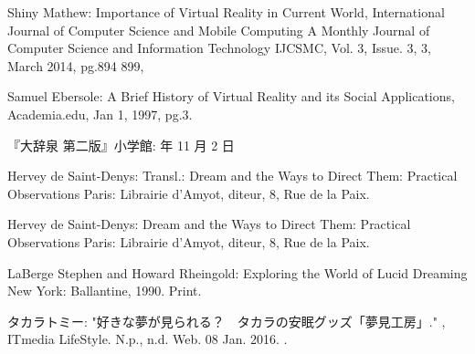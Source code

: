 \begin{bib}[100]



\begin{flushleft}
  Shiny Mathew:
  \newblock Importance of Virtual Reality in Current World,
  \newblock International Journal of Computer Science and Mobile Computing A Monthly Journal of Computer Science and Information Technology IJCSMC, Vol. 3, Issue. 3, 3, March 2014, pg.894  899,
\end{flushleft}

\begin{flushleft}
  Samuel Ebersole:
  \newblock A Brief History of Virtual Reality and its Social Applications, Academia.edu,
  \newblock Jan 1, 1997,  pg.3.
\end{flushleft}

\begin{flushleft}
『大辞泉 第二版』小学館:
   年 11 月 2 日
 \end{flushleft}

\begin{flushleft}
Hervey de Saint-Denys:
  \newblock Transl.: Dream and the Ways to Direct Them: Practical Observations
  \newblock Paris: Librairie d'Amyot, diteur, 8, Rue de la Paix.
 \end{flushleft}
 
\begin{flushleft}
Hervey de Saint-Denys:
  \newblock Dream and the Ways to Direct Them: Practical Observations
  \newblock Paris: Librairie d'Amyot, diteur, 8, Rue de la Paix.
 \end{flushleft}
 
\begin{flushleft}
 LaBerge Stephen and Howard Rheingold:
  \newblock Exploring the World of Lucid Dreaming
  \newblock New York: Ballantine, 1990. Print.
 \end{flushleft}
  
\begin{flushleft}
  タカラトミー:
  \newblock "好きな夢が見られる？　タカラの安眠グッズ「夢見工房」." ,
  \newblock ITmedia LifeStyle. N.p., n.d.
  \newblock Web. 08 Jan. 2016.
  .
\end{flushleft}


\end{bib}
